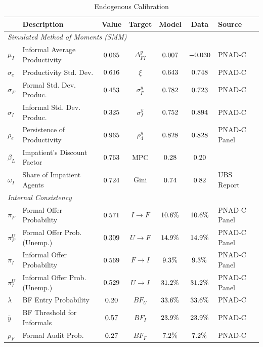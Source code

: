 \begin{table}[htbp]
\centering
\caption{Endogenous Calibration}
\label{tab:int_calibration}
\footnotesize
\begin{tabular}{llccccl}
\toprule
& \textbf{Description} & \textbf{Value} & \textbf{Target} & \textbf{Model} & \textbf{Data} & \textbf{Source} \\
\midrule
\multicolumn{4}{l}{\textit{Simulated Method of Moments (SMM)}} \\[2pt]
$\mu_I$    & Informal Average Productivity & $0.065$     & $\Delta_{FI}^y$ & $0.007$   & $-0.030$   & PNAD-C \\
$\sigma_e$ & Productivity Std. Dev.        & $0.616$     & $\xi$           & $0.643$     & $0.748$     & PNAD-C \\
$\sigma_F$ & Formal Std. Dev. Produc.      & $0.453$  & $\sigma_F^y$    & $0.782$    & $0.723$    & PNAD-C \\
$\sigma_I$ & Informal Std. Dev. Produc.    & $0.325$  & $\sigma_I^y$    & $0.752$    & $0.894$    & PNAD-C \\
$\rho_e$   & Persistence of Productivity   & $0.965$    & $\rho_4^y$      & $0.828$ & $0.828$ & PNAD-C Panel \\
$\beta_L$  & Impatient's Discount Factor   & $0.763$ & MPC             & $0.28$    & $0.20$    & \textcite{galveasuncertain} \\
$\omega_I$ & Share of Impatient Agents     & $0.724$  & Gini            & $0.74$   & $0.82$   & UBS Report \\
[6pt]

\multicolumn{4}{l}{\textit{Internal Consistency}} \\[2pt]
$\pi_F$    & Formal Offer Probability      & $0.571$      & $I \to F$ & $10.6\%$  & $10.6\%$  & PNAD-C Panel \\
$\pi_F^U$  & Formal Offer Prob. (Unemp.)   & $0.309$     & $U \to F$ & $14.9\%$  & $14.9\%$  & PNAD-C Panel \\
$\pi_I$    & Informal Offer Probability    & $0.569$      & $F \to I$ & $9.3\%$  & $9.3\%$  & PNAD-C Panel \\
$\pi_I^U$  & Informal Offer Prob. (Unemp.) & $0.529$     & $U \to I$ & $31.2\%$  & $31.2\%$  & PNAD-C Panel \\
$\lambda$  & BF Entry Probability          & $0.20$ & $BF_U$    & $33.6\%$ & $33.6\%$ & PNAD-C \\
$\bar y$   & BF Threshold for Informals    & $0.57$     & $BF_I$    & $23.9\%$ & $23.9\%$ & PNAD-C \\
$\rho_F$   & Formal Audit Prob.    & $0.27$     & $BF_F$    & $7.2\%$ & $7.2\%$ & PNAD-C \\
\bottomrule
\end{tabular}
\end{table}
